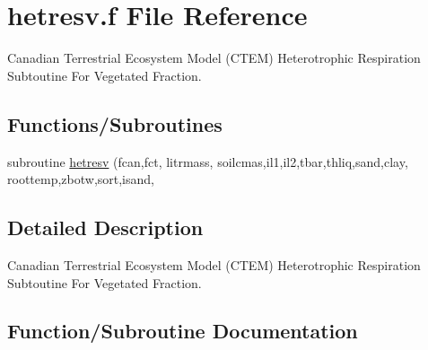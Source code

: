 \hypertarget{hetresv_8f}{}\section{hetresv.\+f File Reference}
\label{hetresv_8f}


Canadian Terrestrial Ecosystem Model (C\+T\+E\+M) Heterotrophic Respiration Subtoutine For Vegetated Fraction.  


\subsection*{Functions/\+Subroutines}
\begin{DoxyCompactItemize}
\item 
subroutine \hyperlink{hetresv_8f_a7c85e7b43e5a20c6049f3fd703627461}{hetresv} (fcan,fct, litrmass, soilcmas,il1,il2,tbar,thliq,sand,clay, roottemp,zbotw,sort,isand,
\end{DoxyCompactItemize}


\subsection{Detailed Description}
Canadian Terrestrial Ecosystem Model (C\+T\+E\+M) Heterotrophic Respiration Subtoutine For Vegetated Fraction. 



\subsection{Function/\+Subroutine Documentation}
\hypertarget{hetresv_8f_a7c85e7b43e5a20c6049f3fd703627461}{}
